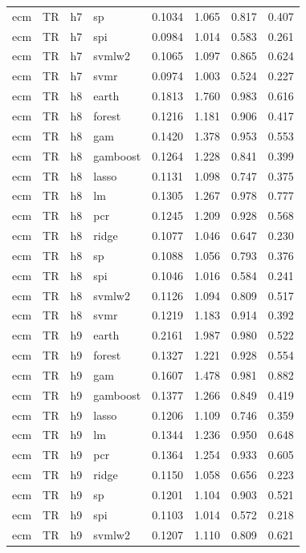 \begin{ThreePartTable}
\begin{longtable}[t]{llclcccc}
ecm & TR & h7 & sp & 0.1034 & 1.065 & 0.817 & 0.407\\
ecm & TR & h7 & spi & 0.0984 & 1.014 & 0.583 & 0.261\\
ecm & TR & h7 & svmlw2 & 0.1065 & 1.097 & 0.865 & 0.624\\
ecm & TR & h7 & svmr & 0.0974 & 1.003 & 0.524 & 0.227\\
\addlinespace
ecm & TR & h8 & earth & 0.1813 & 1.760 & 0.983 & 0.616\\
ecm & TR & h8 & forest & 0.1216 & 1.181 & 0.906 & 0.417\\
ecm & TR & h8 & gam & 0.1420 & 1.378 & 0.953 & 0.553\\
ecm & TR & h8 & gamboost & 0.1264 & 1.228 & 0.841 & 0.399\\
ecm & TR & h8 & lasso & 0.1131 & 1.098 & 0.747 & 0.375\\
ecm & TR & h8 & lm & 0.1305 & 1.267 & 0.978 & 0.777\\
ecm & TR & h8 & pcr & 0.1245 & 1.209 & 0.928 & 0.568\\
ecm & TR & h8 & ridge & 0.1077 & 1.046 & 0.647 & 0.230\\
ecm & TR & h8 & sp & 0.1088 & 1.056 & 0.793 & 0.376\\
ecm & TR & h8 & spi & 0.1046 & 1.016 & 0.584 & 0.241\\
ecm & TR & h8 & svmlw2 & 0.1126 & 1.094 & 0.809 & 0.517\\
ecm & TR & h8 & svmr & 0.1219 & 1.183 & 0.914 & 0.392\\
\addlinespace
ecm & TR & h9 & earth & 0.2161 & 1.987 & 0.980 & 0.522\\
ecm & TR & h9 & forest & 0.1327 & 1.221 & 0.928 & 0.554\\
ecm & TR & h9 & gam & 0.1607 & 1.478 & 0.981 & 0.882\\
ecm & TR & h9 & gamboost & 0.1377 & 1.266 & 0.849 & 0.419\\
ecm & TR & h9 & lasso & 0.1206 & 1.109 & 0.746 & 0.359\\
ecm & TR & h9 & lm & 0.1344 & 1.236 & 0.950 & 0.648\\
ecm & TR & h9 & pcr & 0.1364 & 1.254 & 0.933 & 0.605\\
ecm & TR & h9 & ridge & 0.1150 & 1.058 & 0.656 & 0.223\\
ecm & TR & h9 & sp & 0.1201 & 1.104 & 0.903 & 0.521\\
ecm & TR & h9 & spi & 0.1103 & 1.014 & 0.572 & 0.218\\
ecm & TR & h9 & svmlw2 & 0.1207 & 1.110 & 0.809 & 0.621\\

\end{longtable}
\end{ThreePartTable}
